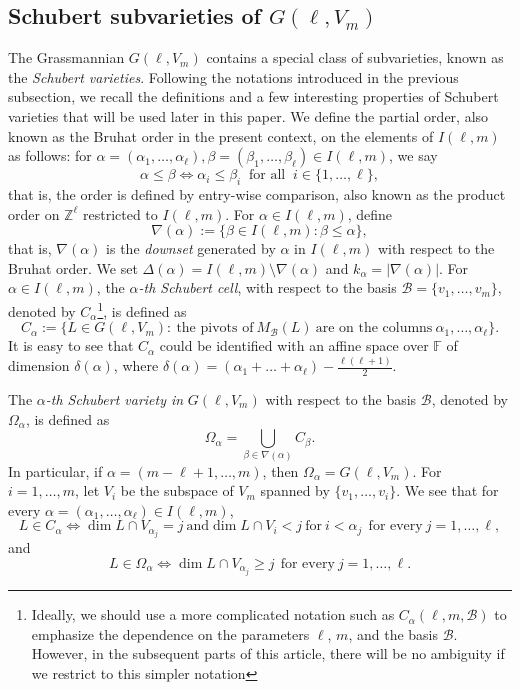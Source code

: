 \documentclass[10pt,a4paper,oneside]{amsproc}
\newcommand{\B}{\mathcal{B}}
\def\a{{\alpha}}
\def\FF{{\mathbb F}}
\begin{document}
\subsection{Schubert subvarieties of $G(\ell, V_m)$}\label{sec:sch} The Grassmannian $G(\ell, V_m)$ contains a special class of 
subvarieties, known as the \emph{Schubert varieties}. Following 
the notations introduced in the previous subsection, we recall 
the definitions and a few interesting properties of Schubert 
varieties that will be used later in this paper. We define the 
partial order, also known as the Bruhat order in the present 
context, on the elements of $I(\ell, m)$ as follows: for 
$\alpha = (\alpha_1, \ldots, \alpha_\ell), \beta = (\beta_1, 
\ldots, \beta_\ell) \in I(\ell, m)$, we say 
$$\alpha \leq \beta \iff \alpha_i \leq \beta_i \ \text{ for all } 
\ i \in \{1, \ldots, \ell\},$$
that is, the order is defined by entry-wise comparison, also 
known as the product order on $\mathbb{Z}^\ell$ restricted to 
$I(\ell, m)$. For $\alpha \in I(\ell, m)$, define 
$$\nabla(\alpha) := \{\beta \in I(\ell,m) : \beta \leq \alpha\},$$
that is, $\nabla(\alpha)$ is the \emph{downset} generated by 
$\alpha$ in $I(\ell, m)$ with respect to the Bruhat order. We 
set $\Delta(\alpha) = I(\ell, m) \setminus \nabla(\alpha)$ and 
$k_\alpha = |\nabla(\alpha)|$. For $\a \in I(\ell, m)$, the 
\emph{$\a$-th Schubert cell}, with respect to the basis 
$\B =\{v_1, \dots, v_m\}$, denoted by $C_{\a}$\footnote{Ideally, 
we should use a more complicated notation such as 
$C_\a (\ell, m, \B)$ to emphasize the dependence on the 
parameters $\ell$, $m$, and the basis $\B$. However, in the 
subsequent parts of this article, there will be no ambiguity 
if we restrict to this simpler notation}, is defined as
$$C_{\a} := \{L \in G(\ell, V_m) : \ \text{the pivots of} \ 
M_{\B}(L) \ \text{are on the columns} \ \a_1, \dots, \a_\ell \}.$$
It is easy to see that $C_\a$ could be identified with an affine 
space over $\FF$ of dimension $\delta (\a)$, where 
$\delta (\a) = (\a_1 + \dots + \a_\ell) - \frac{\ell (\ell+1)}{2}$.

The \emph{$\a$-th Schubert variety in} $G(\ell, V_m)$ with respect to the basis $\B$, denoted by $\Omega_\a$, is defined as 
\begin{equation}\label{Sch}
\Omega_\a = \bigcup_{\beta \in \nabla(\a)} C_{\beta}.
\end{equation}
In particular, if $\a = (m - \ell + 1, \dots, m)$, then $\Omega_\a = G(\ell, V_m)$. 
For $i= 1, \dots, m$, let $V_i$ be the subspace of $V_m$ spanned by $\{v_1, \dots, v_i\}$. We see that for every $\a = (\a_1, \dots, \a_\ell) \in I(\ell, m)$, $$L \in C_{\a} \iff \dim L \cap V_{\a_j} = j  \ \text{and} \dim L \cap V_i < j \ \text{for} \ i < \a_j \ \  \text{for every} \ j = 1, \dots, \ell,$$ and  $$L \in \Omega_{\a} \iff \dim L \cap V_{\a_j} \ge j \ \  \text{for every} \ j = 1, \dots, \ell.$$
\end{document}
